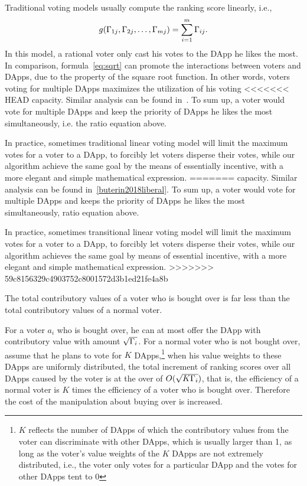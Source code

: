 Traditional voting models usually compute the ranking score linearly, i.e.,
$$g(\Gamma_{1j},\Gamma_{2j},\ldots,\Gamma_{mj}) = \sum_{i=1}^m \Gamma_{ij}.$$
In this model, a rational voter only cast his votes to the DApp he likes the
most. In comparison, formula~\ref{eq:sqrt} can promote the interactions between
voters and DApps, due to the property of the square root function. In other
words, voters voting for multiple DApps maximizes the utilization of his voting
<<<<<<< HEAD
capacity. Similar analysis can be found in~\cite{buterin2018liberal}. To sum up,
a voter would vote for multiple DApps and keep the priority of DApps he likes
the most simultaneously, i.e. the ratio equation above.

In practice, sometimes traditional  linear voting model will limit the maximum votes for a voter to a DApp, to forcibly let voters disperse their votes, while our algorithm achieve the same goal by the means of essentially incentive,  with a more elegant and simple mathematical expression.
=======
capacity. Similar analysis can be found in~\ref{buterin2018liberal}. To sum up,
a voter would vote for multiple DApps and keeps the priority of DApps he likes
the most simultaneously, \ie ratio equation above.

In practice, sometimes transitional  linear voting model will limit the maximum votes for a voter to a DApp, to forcibly let voters disperse their votes, while our algorithm achieves the same goal by  means of essential incentive,  with a more elegant and simple mathematical expression.
>>>>>>> 59c8156329c4903752c8001572d3b1ed21fe4a8b

\begin{corollary}
	The total contributory values of a  voter who is bought over is far less than the total contributory values of a normal voter.
\end{corollary}
For a voter $a_i$ who is bought over, he can at most offer the DApp with contributory value with amount $\sqrt{\Gamma_i}$. For a normal voter who is not bought over, assume that he plans to vote for $K$ DApps,\footnote{$K$ reflects the number of DApps of which the contributory values from the voter can discriminate with other DApps, which is usually larger than 1, as long as the voter's value weights of the $K$ DApps are not extremely distributed, i.e., the voter only votes for a particular DApp and the votes for other DApps tent to 0} when  his value weights to these DApps are uniformly distributed, the total increment of ranking scores  over all DApps caused by the voter is at the over of $O(\sqrt{K\Gamma_i})$, that is, the efficiency of a normal voter is $K$ times the efficiency of a voter who is bought over. Therefore the cost of the manipulation about buying over is increased.

